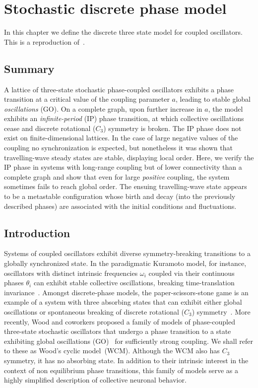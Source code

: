 \chapter{\label{chap:article} Stochastic discrete phase model}

In this chapter we define the discrete three state model for coupled oscillators. This is a reproduction
of~\cite{rodrigues2020synchronization}.

\section{Summary}

A lattice of three-state stochastic phase-coupled oscillators exhibits a phase transition at a critical value of the coupling parameter
$a$, leading to stable global \textit{oscillations} (GO). On a complete graph, upon further increase in $a$, the model exhibits an
\textit{infinite-period} (IP) phase transition, at which collective oscillations cease and discrete rotational ($C_3$) symmetry is
broken. The IP phase does not exist on finite-dimensional lattices.  In the case of large negative values of the coupling no
synchronization is expected, but nonetheless it was shown that travelling-wave steady states are stable, displaying local order. Here,
we verify the IP phase in systems with long-range coupling but of lower connectivity than a complete graph and show that even for large
\textit{ positive} coupling, the system sometimes fails to reach global order. The ensuing travelling-wave state appears to be a
metastable configuration whose birth and decay (into the previously described phases) are associated with the initial conditions and
fluctuations.

\section{Introduction}

Systems of coupled oscillators exhibit diverse symmetry-breaking transitions to a globally synchronized state. In the paradigmatic
Kuramoto model, for instance, oscillators with distinct intrinsic frequencies $\omega_i$ coupled via their continuous phases $\theta_i$
can exhibit stable collective oscillations, breaking time-translation
invariance~\cite{Kuramoto84,Strogatz93,Strogatz00,StrogatzSync,Pikovsky01}.  Amongst discrete-phase models, the paper-scissors-stone
game is an example of a system with three absorbing states that can exhibit either global oscillations or spontaneous breaking of
discrete rotational ($C_3$) symmetry~\cite{Tainaka88,Tainaka89,Tainaka91,Itoh94,Tainaka94}. More recently, Wood and coworkers proposed
a family of models of phase-coupled three-state stochastic oscillators that undergo a phase transition to a state exhibiting global
oscillations (GO)~\cite{Wood06a,Wood06b,Wood07a,Wood07b} for sufficiently strong coupling.  We shall refer to these as Wood's cyclic
model~(WCM). Although the WCM also has $C_3$ symmetry, it has no absorbing state.  In addition to their intrinsic interest in the
context of non equilibrium phase transitions, this family of models serve as a highly simplified description of collective neuronal
behavior.


